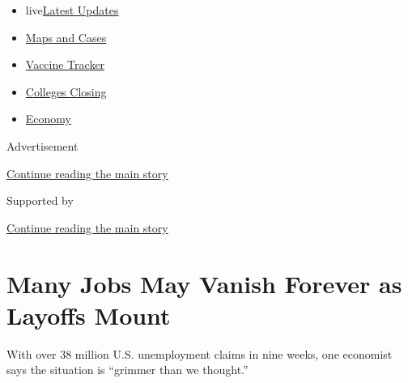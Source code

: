 \begin{itemize}
\tightlist
\item
  live\href{https://www.nytimes3xbfgragh.onion/2020/08/21/world/covid-19-coronavirus.html?name=styln-coronavirus-markets\&region=TOP_BANNER\&variant=undefined\&block=storyline_menu_recirc\&action=click\&pgtype=Article\&impression_id=5676ac51-e39d-11ea-96e4-f332f848a5e5}{Latest
  Updates}
\item
  \href{https://www.nytimes3xbfgragh.onion/interactive/2020/us/coronavirus-us-cases.html?name=styln-coronavirus-markets\&region=TOP_BANNER\&variant=undefined\&block=storyline_menu_recirc\&action=click\&pgtype=Article\&impression_id=5676ac52-e39d-11ea-96e4-f332f848a5e5}{Maps
  and Cases}
\item
  \href{https://www.nytimes3xbfgragh.onion/interactive/2020/science/coronavirus-vaccine-tracker.html?name=styln-coronavirus-markets\&region=TOP_BANNER\&variant=undefined\&block=storyline_menu_recirc\&action=click\&pgtype=Article\&impression_id=5676d360-e39d-11ea-96e4-f332f848a5e5}{Vaccine
  Tracker}
\item
  \href{https://www.nytimes3xbfgragh.onion/2020/08/19/us/colleges-closing-covid.html?name=styln-coronavirus-markets\&region=TOP_BANNER\&variant=undefined\&block=storyline_menu_recirc\&action=click\&pgtype=Article\&impression_id=5676d361-e39d-11ea-96e4-f332f848a5e5}{Colleges
  Closing}
\item
  \href{https://www.nytimes3xbfgragh.onion/live/2020/08/20/business/stock-market-today-coronavirus?name=styln-coronavirus-markets\&region=TOP_BANNER\&variant=undefined\&block=storyline_menu_recirc\&action=click\&pgtype=Article\&impression_id=5676d362-e39d-11ea-96e4-f332f848a5e5}{Economy}
\end{itemize}

Advertisement

\protect\hyperlink{after-top}{Continue reading the main story}

Supported by

\protect\hyperlink{after-sponsor}{Continue reading the main story}

\hypertarget{many-jobs-may-vanish-forever-as-layoffs-mount}{%
\section{Many Jobs May Vanish Forever as Layoffs
Mount}\label{many-jobs-may-vanish-forever-as-layoffs-mount}}

With over 38 million U.S. unemployment claims in nine weeks, one
economist says the situation is ``grimmer than we thought.''

